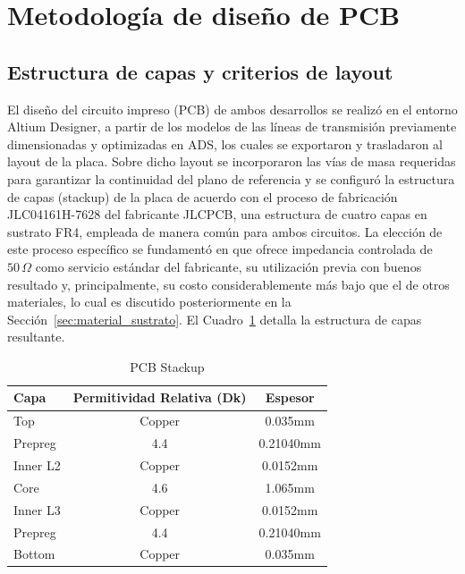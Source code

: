 \section{Metodología de diseño de PCB} \label{sec:metodologia_pcb}
\subsection{Estructura de capas y criterios de layout}
El diseño del circuito impreso (PCB) de ambos desarrollos se realizó en el entorno Altium Designer, a partir de los modelos de las líneas de transmisión previamente dimensionadas y optimizadas en ADS, los cuales se exportaron y trasladaron al layout de la placa. Sobre dicho layout se incorporaron las vías de masa requeridas para garantizar la continuidad del plano de referencia y se configuró la estructura de capas (stackup) de la placa de acuerdo con el proceso de fabricación JLC04161H-7628 del fabricante JLCPCB, una estructura de cuatro capas en sustrato FR4, empleada de manera común para ambos circuitos. La elección de este proceso específico se fundamentó en que ofrece impedancia controlada de $50\,\Omega$ como servicio estándar del fabricante, su utilización previa con buenos resultado y, principalmente, su costo considerablemente más bajo que el de otros materiales, lo cual es discutido posteriormente en la Sección~\ref{sec:material_sustrato}. El Cuadro~\ref{tab:pcb_stackup} detalla la estructura de capas resultante.

\begin{table}[b]
    \caption{PCB Stackup}
    \label{tab:pcb_stackup}
    \centering
    \renewcommand{\arraystretch}{1.1}
    \begin{tabular}{|l|c|c|}
        \hline
        \textbf{Capa} & \textbf{Permitividad Relativa (Dk)} & \textbf{Espesor} \\
        \hline
        Top      & \cellcolor{coppercolor}Copper  & 0.035mm   \\ \hline
        Prepreg  & \cellcolor{dielectriccolor}4.4 & 0.21040mm \\ \hline
        Inner L2 & \cellcolor{coppercolor}Copper  & 0.0152mm  \\ \hline
        Core     & \cellcolor{dielectriccolor}4.6 & 1.065mm   \\ \hline
        Inner L3 & \cellcolor{coppercolor}Copper  & 0.0152mm  \\ \hline
        Prepreg  & \cellcolor{dielectriccolor}4.4 & 0.21040mm \\ \hline
        Bottom   & \cellcolor{coppercolor}Copper  & 0.035mm   \\
        \hline
    \end{tabular}
\end{table}

